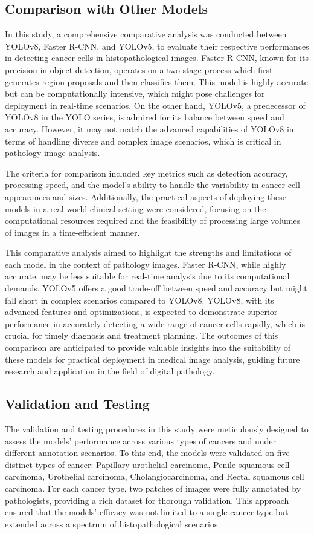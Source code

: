 \documentclass[anon]{midl} %
\begin{document}
\subsection{Comparison with Other Models}
In this study, a comprehensive comparative analysis was conducted between YOLOv8, Faster R-CNN, and YOLOv5, to evaluate their respective performances in detecting cancer cells in histopathological images. Faster R-CNN, known for its precision in object detection, operates on a two-stage process which first generates region proposals and then classifies them. This model is highly accurate but can be computationally intensive, which might pose challenges for deployment in real-time scenarios. On the other hand, YOLOv5, a predecessor of YOLOv8 in the YOLO series, is admired for its balance between speed and accuracy. However, it may not match the advanced capabilities of YOLOv8 in terms of handling diverse and complex image scenarios, which is critical in pathology image analysis.

The criteria for comparison included key metrics such as detection accuracy, processing speed, and the model's ability to handle the variability in cancer cell appearances and sizes. Additionally, the practical aspects of deploying these models in a real-world clinical setting were considered, focusing on the computational resources required and the feasibility of processing large volumes of images in a time-efficient manner.

This comparative analysis aimed to highlight the strengths and limitations of each model in the context of pathology images. Faster R-CNN, while highly accurate, may be less suitable for real-time analysis due to its computational demands. YOLOv5 offers a good trade-off between speed and accuracy but might fall short in complex scenarios compared to YOLOv8. YOLOv8, with its advanced features and optimizations, is expected to demonstrate superior performance in accurately detecting a wide range of cancer cells rapidly, which is crucial for timely diagnosis and treatment planning. The outcomes of this comparison are anticipated to provide valuable insights into the suitability of these models for practical deployment in medical image analysis, guiding future research and application in the field of digital pathology.


\subsection{Validation and Testing}
The validation and testing procedures in this study were meticulously designed to assess the models' performance across various types of cancers and under different annotation scenarios. To this end, the models were validated on five distinct types of cancer: Papillary urothelial carcinoma, Penile squamous cell carcinoma, Urothelial carcinoma, Cholangiocarcinoma, and Rectal squamous cell carcinoma. For each cancer type, two patches of images were fully annotated by pathologists, providing a rich dataset for thorough validation. This approach ensured that the models' efficacy was not limited to a single cancer type but extended across a spectrum of histopathological scenarios.
\end{document}
